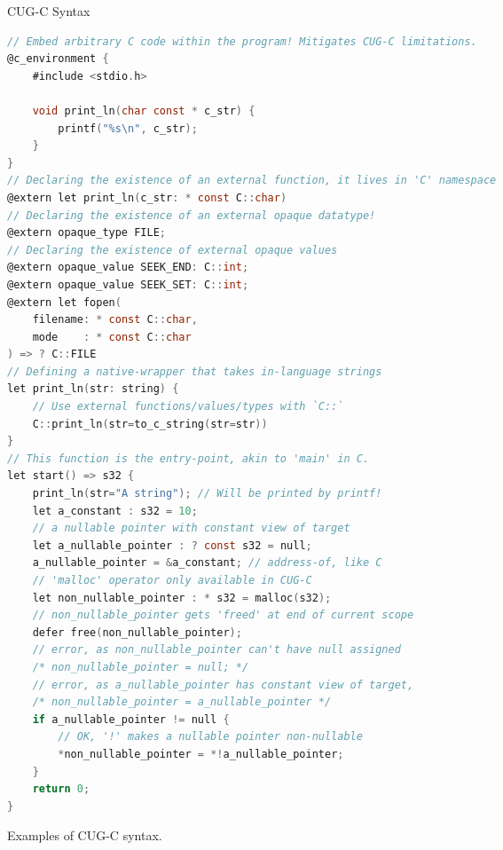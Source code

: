 \documentclass[a4paper,12pt,twoside,openright]{report}
\begin{document}
\begin{lstfloat}
\begin{center} CUG-C Syntax\end{center}
\begin{lstlisting}[language=C]
// Embed arbitrary C code within the program! Mitigates CUG-C limitations.
@c_environment {
    #include <stdio.h>

    void print_ln(char const * c_str) {
        printf("%s\n", c_str);
    }
}
// Declaring the existence of an external function, it lives in 'C' namespace
@extern let print_ln(c_str: * const C::char)
// Declaring the existence of an external opaque datatype!
@extern opaque_type FILE;
// Declaring the existence of external opaque values
@extern opaque_value SEEK_END: C::int;
@extern opaque_value SEEK_SET: C::int;
@extern let fopen(
    filename: * const C::char,
    mode    : * const C::char
) => ? C::FILE
// Defining a native-wrapper that takes in-language strings
let print_ln(str: string) {
    // Use external functions/values/types with `C::`
    C::print_ln(str=to_c_string(str=str))
}
// This function is the entry-point, akin to 'main' in C.
let start() => s32 {
    print_ln(str="A string"); // Will be printed by printf!
    let a_constant : s32 = 10;
    // a nullable pointer with constant view of target
    let a_nullable_pointer : ? const s32 = null;
    a_nullable_pointer = &a_constant; // address-of, like C
    // 'malloc' operator only available in CUG-C
    let non_nullable_pointer : * s32 = malloc(s32);
    // non_nullable_pointer gets 'freed' at end of current scope
    defer free(non_nullable_pointer);
    // error, as non_nullable_pointer can't have null assigned
    /* non_nullable_pointer = null; */
    // error, as a_nullable_pointer has constant view of target,
    /* non_nullable_pointer = a_nullable_pointer */
    if a_nullable_pointer != null {
        // OK, '!' makes a nullable pointer non-nullable
        *non_nullable_pointer = *!a_nullable_pointer;
    }
    return 0;
}
\end{lstlisting}
\caption{Examples of CUG-C syntax.}
\label{lst:cug_c_syntax}
\end{lstfloat}
\end{document}
